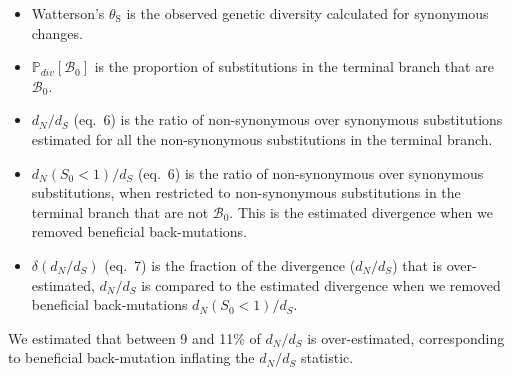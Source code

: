 \documentclass{article}
\newcommand{\proba}{\mathbb{P}}
\newcommand{\dn}{d_N}
\newcommand{\ds}{d_S}
\newcommand{\dnds}{\dn / \ds}
\newcommand{\Sphy}{S_{0}}
\newcommand{\SphyBen}{\mathcal{B}_0}
\newcommand{\thetaSyn}{\theta_{\text{S}}}
\begin{document}
    \begin{itemize}
        \item Watterson's $\thetaSyn$ is the observed genetic diversity calculated for synonymous changes.
        \item $\proba_{div}[\SphyBen]$ is the proportion of substitutions in the terminal branch that are $\SphyBen$.
        \item $\dnds$ (eq.~6) is the ratio of non-synonymous over synonymous substitutions estimated for all the non-synonymous substitutions in the terminal branch.
        \item $\dn(\Sphy < 1) / \ds$ (eq.~6) is the ratio of non-synonymous over synonymous substitutions, when restricted to non-synonymous substitutions in the terminal branch that are not $\SphyBen$.
        This is the estimated divergence when we removed beneficial back-mutations.
        \item $\delta(\dnds)$ (eq.~7) is the fraction of the divergence ($\dnds$) that is over-estimated, $\dnds$ is compared to the estimated divergence when we removed beneficial back-mutations $\dn(\Sphy < 1) / \ds$.
    \end{itemize}
    We estimated that between 9 and 11\% of $\dnds$ is over-estimated, corresponding to beneficial back-mutation inflating the $\dnds$ statistic.

    \newpage
\end{document}
